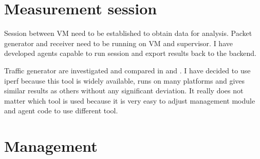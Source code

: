 \section{Measurement session}
Session between \Ac{VM} need to be established to obtain data for analysis. Packet generator and receiver need to be running on \Ac{VM} and supervisor. I have developed agents capable to run session and export results back to the backend.

Traffic generator are investigated and compared in \cite{traffic-generators1} and \cite{traffic-generators2}. I have decided to use iperf because this tool is widely available, runs on many platforms and gives similar results as others without any significant deviation. It really does not matter which tool is used because it is very easy to adjust management module and agent code to use different tool.

\section{Management}

